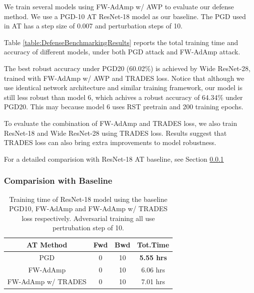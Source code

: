 \documentclass{article}
\begin{document}
            We train several models using FW-AdAmp w/ AWP to evaluate our defense method. We use a PGD-10 AT ResNet-18 model as our baseline. The PGD used in AT has a step size of 0.007 and perturbation steps of 10. 

            Table \ref{table:DefenseBenchmarkingResults} reports the total training time and accuracy of different models, under both PGD attack and FW-AdAmp attack.

            The best robust accuracy under PGD20 (60.02\%) is achieved by Wide ResNet-28, trained with FW-AdAmp w/ AWP and TRADES loss. Notice that although we use identical network architecture and similar training framework, our model is still less robust than model 6, which achives a robust accuracy of 64.34\% under PGD20. This may because model 6 uses RST pretrain and 200 training epochs.

            To evaluate the combination of FW-AdAmp and TRADES loss, we also train ResNet-18 and Wide ResNet-28 using TRADES loss. Results suggest that TRADES loss can also bring extra improvements to model robustness.

            For a detailed comparision with ResNet-18 AT baseline, see Section \ref{subs:DefenseAgainstBaseline}
        
        \subsubsection{Comparision with Baseline}\label{subs:DefenseAgainstBaseline}
            \begin{table}[h]
                \centering
                \begin{tabular}{cccc}
                \hline
                AT Method          & Fwd & Bwd & Tot.Time \\ \hline
                PGD                & 0   & 10  & \textbf{5.55 hrs} \\
                FW-AdAmp           & 0   & 10  & 6.06 hrs \\
                FW-AdAmp w/ TRADES & 0   & 10  & 7.01 hrs \\ \hline
                \end{tabular}
                \caption{Training time of ResNet-18 model using the baseline PGD10, FW-AdAmp and FW-AdAmp w/ TRADES loss respectively. Adversarial training all use pertrubation step of 10.}
                \label{table:RN18TrnTime}
            \end{table}
\end{document}
